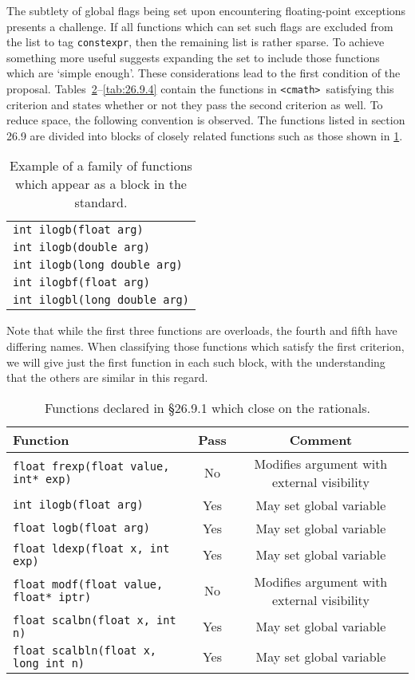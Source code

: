 \documentclass[prd,preprint,amsmath,amssymb,nofootinbib,eqsecnum]{revtex4-1}
\newcommand{\constexpr}{\code{constexpr}\xspace}
\newcommand{\code}[1]{{\tt #1}}
\newcommand{\header}[1]{{\tt <#1>}}
\newcommand{\cmath}{\header{cmath}}
\begin{document}
The subtlety of global flags being set upon encountering floating-point
exceptions presents a challenge. If all functions which can set such flags are
excluded from the list to tag \constexpr, then the remaining list is rather
sparse. To achieve something more useful suggests expanding the set to include
those functions which are `simple enough'. These considerations lead to the
first condition of the proposal.
Tables~\ref{tab:26.9.1}--\ref{tab:26.9.4} contain the functions in \cmath\
satisfying this criterion and states whether or not they pass the second
criterion as well. To reduce space, the following convention is observed. The
functions listed in section 26.9 are divided into blocks of closely related
functions such as those shown in \ref{tab:example}. 
\begin{table}
	\begin{tabular}{l}
		\code{int ilogb(float arg)}
	\\
		\code{int ilogb(double arg)}
	\\
		\code{int ilogb(long double arg)}
	\\
		\code{int ilogbf(float arg)}
	\\
		\code{int ilogbl(long double arg)}
	\end{tabular}
\caption{Example of a family of functions which appear as a block in the standard.}
\label{tab:example}
\end{table}
Note that while the first three functions are overloads, the fourth and fifth
have differing names.  When classifying those functions which satisfy the first
criterion, we will give just the first function in each such block, with the
understanding that the others are similar in this regard.

\begin{table}[h]
	\begin{tabular}{lcc}
		Function & Pass & Comment
	\\
	\hline \hline
		\code{float frexp(float value, int* exp)} & No & Modifies argument with external visibility
	\\
	\hline
		\code{int ilogb(float arg)} & Yes & May set global variable
	\\
	\hline
		\code{float logb(float arg)} & Yes & May set global variable
	\\
	\hline
		\code{float ldexp(float x, int exp)} & Yes & May set global variable
	\\
	\hline
		\code{float modf(float value, float* iptr)} & No & Modifies argument with external visibility
	\\
	\hline
		\code {float scalbn(float x, int n)} & Yes & May set global variable
	\\
	\hline
		\code {float scalbln(float x, long int n)} & Yes & May set global variable
	\end{tabular}
\caption{Functions declared in \S 26.9.1 which close on the rationals.}
\label{tab:26.9.1}
\end{table}
\end{document}
